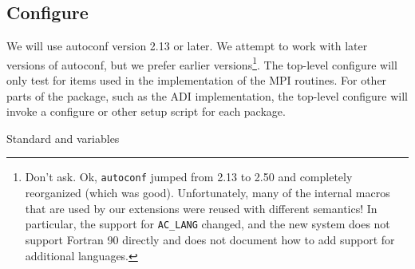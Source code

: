 \documentclass{article}
\begin{document}

\subsection{Configure}
\label{sec:configure}
We will use autoconf version 2.13 or later.
We attempt to work with later versions of autoconf, but we prefer
earlier versions\footnote{Don't ask.  Ok, \texttt{autoconf} jumped from 2.13 to
  2.50 and completely reorganized (which was good).  Unfortunately, many of the
  internal macros that are used by our extensions were reused with
  different semantics!  In particular, the support for
  \texttt{AC_LANG} changed, and the new system does not support
  Fortran 90 directly and does not document how to add support for
  additional languages.}.  The top-level configure will only
test for items used in the implementation of the MPI routines.  For
other parts of the package, such as the ADI implementation, the
top-level configure will invoke a configure or other setup script for
each package.


Standard  and  variables
\begin{description}

\end{description}
\end{document}
